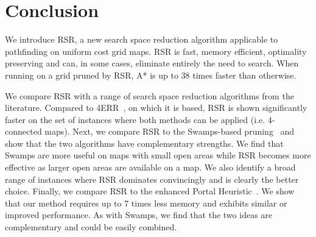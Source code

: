 \section{Conclusion}
We introduce RSR, a new search space reduction algorithm applicable to
pathfinding on uniform cost grid maps. RSR is fast, memory efficient,
optimality preserving and can, in some cases, eliminate entirely the need
to search.  
When running on a grid pruned by RSR, A* is up to 38 times faster than
otherwise.
\par
We compare RSR with a range of search space reduction algorithms from the
literature. Compared to 4ERR~\cite{harabor10}, on which it is based, RSR is
shown significantly faster on the set of instances where both methods can be
applied (i.e. 4-connected maps).  Next, we compare RSR to the Swamps-based
pruning~\cite{pochter10} and show that the two algorithms have complementary
strengths.  We find that Swamps are more useful on maps with small open areas
while RSR becomes more effective as larger open areas are available on a map. We
also identify a broad range of instances where RSR dominates convincingly and is
clearly the better choice.  Finally, we compare RSR to the enhanced Portal
Heuristic~\cite{goldenberg10}.  We show that our method requires up to 7 times
less memory and exhibits similar or improved performance.  As with Swamps, we
find that the two ideas are complementary and could be easily combined.




